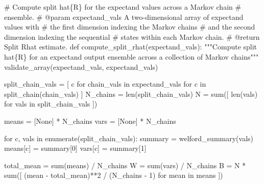 \documentclass[
  letterpaper,
  DIV=11,
  numbers=noendperiod]{scrartcl}
\newenvironment{Shaded}{\begin{snugshade}}{\end{snugshade}}
\newcommand{\BuiltInTok}[1]{\textcolor[rgb]{0.00,0.23,0.31}{#1}}
\newcommand{\CommentTok}[1]{\textcolor[rgb]{0.37,0.37,0.37}{#1}}
\newcommand{\ControlFlowTok}[1]{\textcolor[rgb]{0.00,0.23,0.31}{#1}}
\newcommand{\DecValTok}[1]{\textcolor[rgb]{0.68,0.00,0.00}{#1}}
\newcommand{\KeywordTok}[1]{\textcolor[rgb]{0.00,0.23,0.31}{#1}}
\newcommand{\NormalTok}[1]{\textcolor[rgb]{0.00,0.23,0.31}{#1}}
\newcommand{\OperatorTok}[1]{\textcolor[rgb]{0.37,0.37,0.37}{#1}}
\newcommand{\StringTok}[1]{\textcolor[rgb]{0.13,0.47,0.30}{#1}}
\newcommand{\VariableTok}[1]{\textcolor[rgb]{0.07,0.07,0.07}{#1}}
\begin{document}
\begin{Shaded}
\begin{Highlighting}[]
\CommentTok{\# Compute split hat\{R\} for the expectand values across a Markov chain}
\CommentTok{\# ensemble.}
\CommentTok{\# @param expectand\_vals A two{-}dimensional array of expectand values with}
\CommentTok{\#                       the first dimension indexing the Markov chains}
\CommentTok{\#                       and the second dimension indexing the sequential}
\CommentTok{\#                       states within each Markov chain.}
\CommentTok{\# @return Split Rhat estimate.}
\KeywordTok{def}\NormalTok{ compute\_split\_rhat(expectand\_vals):}
  \CommentTok{"""Compute split hat\{R\} for an expectand output ensemble across}
\CommentTok{     a collection of Markov chains"""}
\NormalTok{  validate\_array(expectand\_vals, }\StringTok{\textquotesingle{}expectand\_vals\textquotesingle{}}\NormalTok{)}

\NormalTok{  split\_chain\_vals }\OperatorTok{=}\NormalTok{ [ c }\ControlFlowTok{for}\NormalTok{ chain\_vals }\KeywordTok{in}\NormalTok{ expectand\_vals}
                       \ControlFlowTok{for}\NormalTok{ c }\KeywordTok{in}\NormalTok{ split\_chain(chain\_vals) ]}
\NormalTok{  N\_chains }\OperatorTok{=} \BuiltInTok{len}\NormalTok{(split\_chain\_vals)}
\NormalTok{  N }\OperatorTok{=} \BuiltInTok{sum}\NormalTok{([ }\BuiltInTok{len}\NormalTok{(vals) }\ControlFlowTok{for}\NormalTok{ vals }\KeywordTok{in}\NormalTok{ split\_chain\_vals ])}

\NormalTok{  means }\OperatorTok{=}\NormalTok{ [}\VariableTok{None}\NormalTok{] }\OperatorTok{*}\NormalTok{ N\_chains}
  \BuiltInTok{vars} \OperatorTok{=}\NormalTok{ [}\VariableTok{None}\NormalTok{] }\OperatorTok{*}\NormalTok{ N\_chains}

  \ControlFlowTok{for}\NormalTok{ c, vals }\KeywordTok{in} \BuiltInTok{enumerate}\NormalTok{(split\_chain\_vals):}
\NormalTok{    summary }\OperatorTok{=}\NormalTok{ welford\_summary(vals)}
\NormalTok{    means[c] }\OperatorTok{=}\NormalTok{ summary[}\DecValTok{0}\NormalTok{]}
    \BuiltInTok{vars}\NormalTok{[c] }\OperatorTok{=}\NormalTok{ summary[}\DecValTok{1}\NormalTok{]}

\NormalTok{  total\_mean }\OperatorTok{=} \BuiltInTok{sum}\NormalTok{(means) }\OperatorTok{/}\NormalTok{ N\_chains}
\NormalTok{  W }\OperatorTok{=} \BuiltInTok{sum}\NormalTok{(}\BuiltInTok{vars}\NormalTok{) }\OperatorTok{/}\NormalTok{ N\_chains}
\NormalTok{  B }\OperatorTok{=}\NormalTok{ N }\OperatorTok{*} \BuiltInTok{sum}\NormalTok{([ (mean }\OperatorTok{{-}}\NormalTok{ total\_mean)}\OperatorTok{**}\DecValTok{2} \OperatorTok{/}\NormalTok{ (N\_chains }\OperatorTok{{-}} \DecValTok{1}\NormalTok{)}
                \ControlFlowTok{for}\NormalTok{ mean }\KeywordTok{in}\NormalTok{ means ])}


\end{Highlighting}
\end{Shaded}
\end{document}
